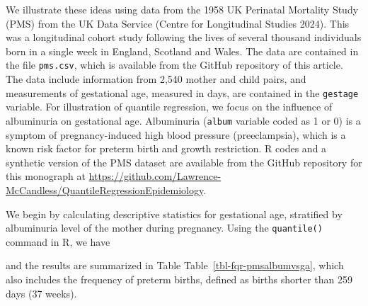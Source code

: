 \documentclass[
  letterpaper,
  DIV=11,
  numbers=noendperiod]{scrartcl}
\newenvironment{Shaded}{\begin{snugshade}}{\end{snugshade}}
\newcommand{\AttributeTok}[1]{\textcolor[rgb]{0.40,0.45,0.13}{#1}}
\newcommand{\DecValTok}[1]{\textcolor[rgb]{0.68,0.00,0.00}{#1}}
\newcommand{\FloatTok}[1]{\textcolor[rgb]{0.68,0.00,0.00}{#1}}
\newcommand{\FunctionTok}[1]{\textcolor[rgb]{0.28,0.35,0.67}{#1}}
\newcommand{\NormalTok}[1]{\textcolor[rgb]{0.00,0.23,0.31}{#1}}
\newcommand{\SpecialCharTok}[1]{\textcolor[rgb]{0.37,0.37,0.37}{#1}}
\begin{document}
We illustrate these ideas using data from the 1958 UK Perinatal
Mortality Study (PMS) from the UK Data Service (Centre for Longitudinal
Studies 2024). This was a longitudinal cohort study following the lives
of several thousand individuals born in a single week in England,
Scotland and Wales. The data are contained in the file \texttt{pms.csv},
which is available from the GitHub repository of this article. The data
include information from 2,540 mother and child pairs, and measurements
of gestational age, measured in days, are contained in the
\texttt{gestage} variable. For illustration of quantile regression, we
focus on the influence of albuminuria on gestational age. Albuminuria
(\texttt{album} variable coded as 1 or 0) is a symptom of
pregnancy-induced high blood pressure (preeclampsia), which is a known
risk factor for preterm birth and growth restriction. R codes and a
synthetic version of the PMS dataset are available from the GitHub
repository for this monograph at
\url{https://github.com/Lawrence-McCandless/QuantileRegressionEpidemiology}.

We begin by calculating descriptive statistics for gestational age,
stratified by albuminuria level of the mother during pregnancy. Using
the \texttt{quantile()} command in R, we have

\begin{Shaded}
\end{Shaded}

and the results are summarized in Table
Table~\ref{tbl-fqr-pmsalbumvsga}, which also includes the frequency of
preterm births, defined as births shorter than 259 days (37 weeks).
\end{document}
